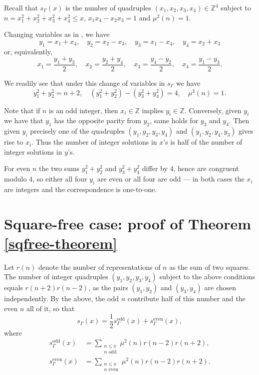 \documentclass[12pt]{amsart}
\theoremstyle{remark}
\newcommand{\Z}{\mathbb{Z}}
\begin{document}
Recall that $s_{\Gamma}(x)$ is the number of quadruples $(x_1,x_2,x_3,x_4) \in \Z^4$ subject to $n = x_1^2 + x_2^2 + x_3^2 + x_4^2 \le x$, $x_1x_4-x_2x_3 = 1$ and $\mu^2(n) = 1$.

Changing variables as in \cite{MR2486486}, we have
\[
    y_1 = x_1 + x_4, \quad 
    y_2 = x_2 - x_3, \quad 
    y_3 = x_1 - x_4, \quad 
    y_4 = x_2 + x_3
\]
or, equivalently,
\[
    x_1 = \frac{y_1 + y_3}{2}, \quad 
    x_2 = \frac{y_2 + y_4}{2}, \quad 
    x_3 = \frac{y_4 - y_2}{2}, \quad 
    x_4 = \frac{y_1 - y_3}{2}.
\]

We readily see that under this change of variables in $s_\Gamma$ we have
\[
    y_1^2+y_2^2=n+2, \quad (y_1^2+y_2^2)-(y_3^2+y_4^2)=4, \quad \mu^2(n)=1.
\]

Note that if $n$ is an odd integer, then $x_i \in \Z$ implies $y_i \in \Z$. 
Conversely, given $y_i$ we have that $y_1$ has the opposite parity from $y_2$, same holds for $y_3$ and $y_4$.
Then given $y_i$ precisely one of the quadruples $(y_1,y_2,y_3,y_4)$ and $(y_1,y_2,y_4,y_3)$ gives rise to $x_i$.
Thus the number of integer solutions in $x$'s is half of the number of integer solutions in $y$'s.

For even $n$ the two sums $y_1^2 + y_2^2$ and $y_3^2 + y_4^2$ differ by $4$, hence are congruent modulo $4$, so either all four $y_i$ are even or all four are odd --- in both cases the $x_i$ are integers and the correspondence is one-to-one.
\section{Square-free case: proof of Theorem \ref{sqfree-theorem}}

Let $r(n)$ denote the number of representations of $n$ as the sum of two squares.
The number of integer quadruples $(y_1,y_2,y_3,y_4)$  subject to the above conditions equals $r(n+2)r(n-2)$, as the pairs $(y_1, y_2)$ and $(y_3, y_4)$ are chosen independently.
By the above, the odd $n$ contribute half of this number and the even $n$ all of it, so that
\begin{equation} \label{sqfree-decomp}
    s_{\Gamma}(x) = \frac{1}{2}s_{\Gamma}^{\text{odd}}(x)+ s_{\Gamma}^{\text{even}}(x),
\end{equation}
where
\[
    \begin{split}
        s_{\Gamma}^{\text{odd}}(x) &= \sum_{\substack{n\le x\\ n \text{ odd}}}\mu^2(n)r(n-2)r(n+2),
        \\
        s_{\Gamma}^{\text{even}}(x) &= 
        \sum_{\substack{n\le x\\ n \text{ even}}}\mu^2(n)r(n-2)r(n+2).
    \end{split}
\]
\end{document}
